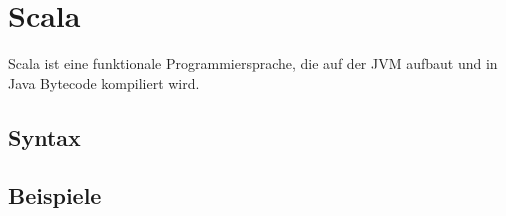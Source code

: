 \chapter{Scala}

Scala ist eine funktionale Programmiersprache, die auf der JVM aufbaut
und in Java Bytecode kompiliert wird.

\section{Syntax}
\section{Beispiele}


